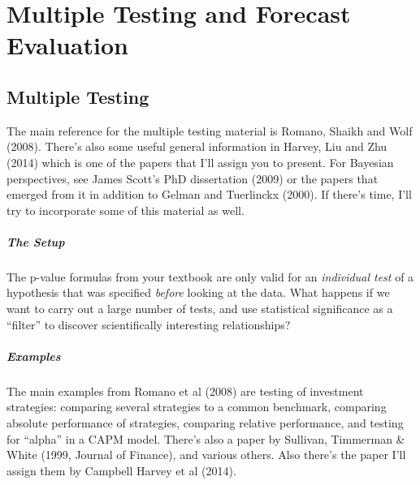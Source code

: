 \chapter{Multiple Testing and Forecast Evaluation}

\section{Multiple Testing}
The main reference for the multiple testing material is Romano, Shaikh and Wolf (2008).
There's also some useful general information in Harvey, Liu and Zhu (2014) which is one of the papers that I'll assign you to present.
For Bayesian perspectives, see James Scott's PhD dissertation (2009) or the papers that emerged from it in addition to Gelman and Tuerlinckx (2000).
If there's time, I'll try to incorporate some of this material as well.

\paragraph{The Setup} 
The p-value formulas from your textbook are only valid for an \emph{individual test} of a hypothesis that was specified \emph{before} looking at the data.
What happens if we want to carry out a large number of tests, and use statistical significance as a ``filter'' to discover scientifically interesting relationships?

\paragraph{Examples}
The main examples from Romano et al (2008) are testing of investment strategies: comparing several strategies to a common benchmark, comparing absolute performance of strategies, comparing relative performance, and testing for ``alpha'' in a CAPM model.
There's also a paper by Sullivan, Timmerman \& White (1999, Journal of Finance), and various others.
Also there's the paper I'll assign them by Campbell Harvey et al (2014).

